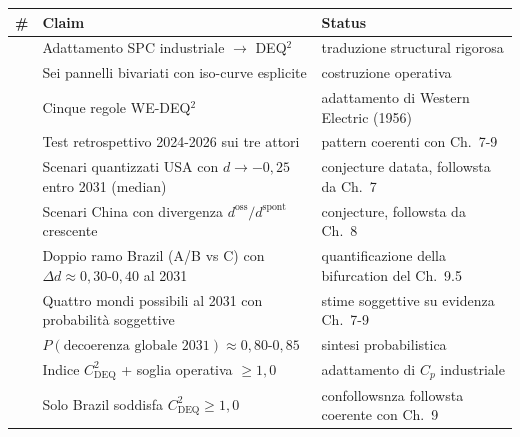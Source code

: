 {\def\LTcaptype{none} %
{\small\begin{longtable}[]{@{}
  >{\raggedright\arraybackslash}p{}
  >{\raggedright\arraybackslash}p{}
  >{\raggedright\arraybackslash}p{}@{}}
\toprule\noalign{}
\begin{minipage}[b]{\linewidth}\raggedright
\#
\end{minipage} & \begin{minipage}[b]{\linewidth}\raggedright
Claim
\end{minipage} & \begin{minipage}[b]{\linewidth}\raggedright
Status
\end{minipage} \\
\midrule\noalign{}
\endhead
\bottomrule\noalign{}
\endlastfoot
1 & Adattamento SPC industriale $\to$ DEQ$^2$ & \Hypoth{} traduzione
structural rigorosa \\
2 & Sei pannelli bivariati con iso-curve esplicite & \Hypoth{}
costruzione operativa \\
3 & Cinque regole WE-DEQ$^2$ & \Hypoth{} adattamento di Western Electric
(1956) \\
4 & Test retrospettivo 2024-2026 sui tre attori & \Proved{} pattern
coerenti con Ch.~7-9 \\
5 & Scenari quantizzati USA con \(d \to -0{,}25\) entro 2031 (median) &
\Conj{} conjecture datata, followsta da Ch.~7 \\
6 & Scenari China con divergenza \(d^{\text{oss}}/d^{\text{spont}}\)
crescente & \Conj{} conjecture, followsta da Ch.~8 \\
7 & Doppio ramo Brazil (A/B vs C) con
\(\Delta d \approx 0{,}30\)-\(0{,}40\) al 2031 & \Conj{} quantificazione
della bifurcation del Ch.~9.5 \\
8 & Quattro mondi possibili al 2031 con probabilità soggettive & \Conj{}
stime soggettive su evidenza Ch.~7-9 \\
9 & \(P(\text{decoerenza globale 2031}) \approx 0{,}80\)-\(0{,}85\) &
\Conj{} sintesi probabilistica \\
10 & Indice \(C_{\text{DEQ}}^2\) + soglia operativa \(\geq 1{,}0\) &
\Hypoth{} adattamento di \(C_p\) industriale \\
11 & Solo Brazil soddisfa \(C_{\text{DEQ}}^2 \geq 1{,}0\) & \Hypoth{}
confollowsnza followsta coerente con Ch.~9 \\
\end{longtable}}
}


